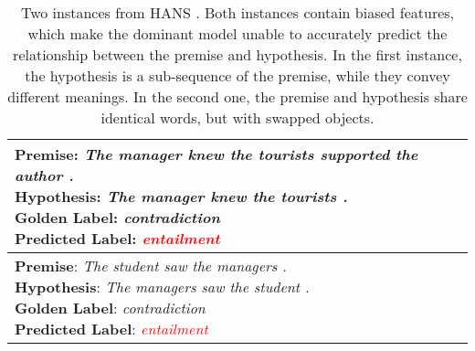 \begin{table}[tb]
\small
\center
\renewcommand{\arraystretch}{1.1}
\begin{tabularx}{0.45\textwidth}{ l }
\toprule[1pt]
\makecell[l]{\textbf{Premise}:  \textit{The manager knew the tourists supported the author .} \\ 
\textbf{Hypothesis}:  \textit{The manager knew the tourists .} \\  
\textbf{Golden Label}:  \textit{contradiction} \\
\textbf{Predicted Label}:  \textit{\textcolor{red} {entailment}}} \\
\hline
\makecell[l]{\textbf{Premise}:  \textit{The student saw the managers .} \\ 
\textbf{Hypothesis}:  \textit{The managers saw the student .} \\ 
\textbf{Golden Label}:  \textit{contradiction} \\
\textbf{Predicted Label}: \textit{\textcolor{red}{entailment}}} \\
\bottomrule[1pt]
\end{tabularx}
\caption{Two instances from HANS \cite{McCoyPL19}. Both instances contain biased features, which make the dominant model \cite{devlin-etal-2019-bert} unable to accurately predict the relationship between the premise and hypothesis. In the first instance, the hypothesis is a sub-sequence of the premise, while they convey different meanings. In the second one, the premise and hypothesis share identical words, but with swapped objects.}
\label{tab:case_intro}
\end{table} 
